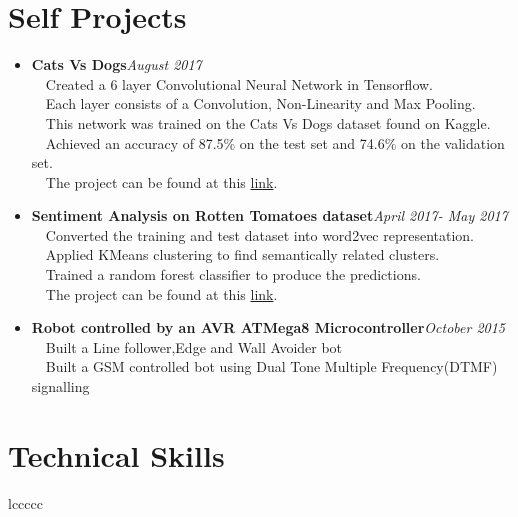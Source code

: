 \documentclass[margin, centered]{res}
\begin{document}
\begin{resume}
\section{\textbf{Self Projects}}
\begin{itemize}
\item \textbf{Cats Vs Dogs}\hfill\textit{August 2017}\\
~\textbullet~Created a 6 layer Convolutional Neural Network in Tensorflow.\\
~\textbullet~Each layer consists of a Convolution, Non-Linearity and Max Pooling.\\
~\textbullet~This network was trained on the Cats Vs Dogs dataset found on Kaggle.\\
~\textbullet~Achieved an accuracy of 87.5\% on the test set and 74.6\% on the validation set.\\
~\textbullet~The project can be found at this \href{https://github.com/harshanavkis/Dogs-Vs-Cats}{link}.\\
\end{itemize}

\begin{itemize}
\item \textbf{Sentiment Analysis on Rotten Tomatoes dataset}\hfill\textit{April 2017- May 2017}\\
~\textbullet~Converted the training and test dataset into word2vec representation.\\
~\textbullet~Applied KMeans clustering to find semantically related clusters.\\
~\textbullet~Trained a random forest classifier to produce the predictions.\\
~\textbullet~The project can be found at this \href{https://github.com/harshanavkis/Kaggle-Rotten-Tomatoes-Competition}{link}.\\
\end{itemize}

\begin{itemize}
\item \textbf{Robot controlled by an AVR ATMega8 Microcontroller}\hfill\textit{October 2015}\\
~\textbullet~Built a Line follower,Edge and Wall Avoider bot\\
~\textbullet~Built a GSM controlled bot using Dual Tone Multiple Frequency(DTMF) signalling
\end{itemize}

\section{\textbf{Technical Skills}}
\begin{tabular}{{l}ccccc}


\end{tabular}
\end{resume}
\end{document}
